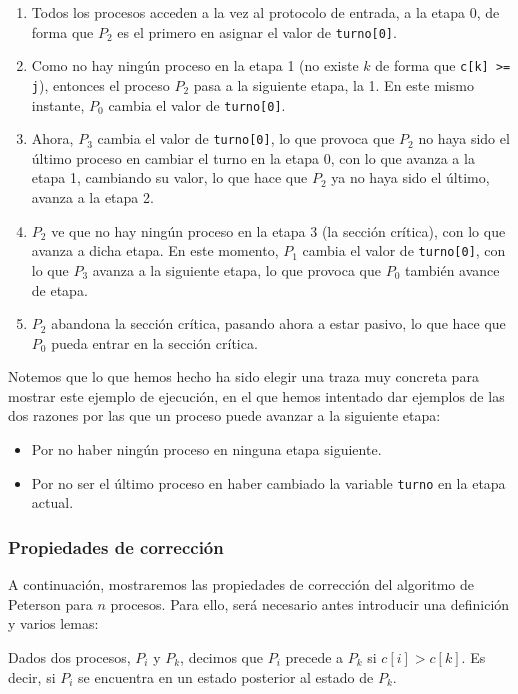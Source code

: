 \begin{ejemplo}
\begin{enumerate}[label=(\arabic*), start=0]
        \item Todos los procesos acceden a la vez al protocolo de entrada, a la etapa 0, de forma que $P_2$ es el primero en asignar el valor de \verb|turno[0]|.
        \item Como no hay ningún proceso en la etapa 1 (no existe $k$ de forma que \verb|c[k] >= j|), entonces el proceso $P_2$ pasa a la siguiente etapa, la 1. En este mismo instante, $P_0$ cambia el valor de \verb|turno[0]|.
        \item Ahora, $P_3$ cambia el valor de \verb|turno[0]|, lo que provoca que $P_2$ no haya sido el último proceso en cambiar el turno en la etapa 0, con lo que avanza a la etapa 1, cambiando su valor, lo que hace que $P_2$ ya no haya sido el último, avanza a la etapa 2.
        \item $P_2$ ve que no hay ningún proceso en la etapa 3 (la sección crítica), con lo que avanza a dicha etapa. En este momento, $P_1$ cambia el valor de \verb|turno[0]|, con lo que $P_3$ avanza a la siguiente etapa, lo que provoca que $P_0$ también avance de etapa.
        \item $P_2$ abandona la sección crítica, pasando ahora a estar pasivo, lo que hace que $P_0$ pueda entrar en la sección crítica.
    \end{enumerate}
    Notemos que lo que hemos hecho ha sido elegir una traza muy concreta para mostrar este ejemplo de ejecución, en el que hemos intentado dar ejemplos de las dos razones por las que un proceso puede avanzar a la siguiente etapa:
    \begin{itemize}
        \item Por no haber ningún proceso en ninguna etapa siguiente.
        \item Por no ser el último proceso en haber cambiado la variable \verb|turno| en la etapa actual.
    \end{itemize}
\end{ejemplo}

\subsubsection{Propiedades de corrección}
A continuación, mostraremos las propiedades de corrección del algoritmo de Peterson para $n$ procesos. Para ello, será necesario antes introducir una definición y varios lemas:

\begin{definicion}[Precedencia]
    Dados dos procesos, $P_i$ y $P_k$, decimos que $P_i$ precede a $P_k$ si $c[i] > c[k]$. Es decir, si $P_i$ se encuentra en un estado posterior al estado de $P_k$.
\end{definicion}

